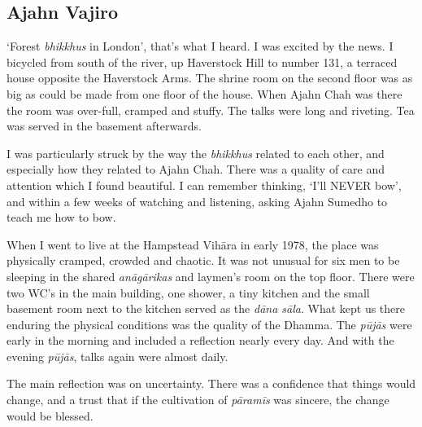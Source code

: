 \subsection{Ajahn Vajiro}

`Forest \emph{bhikkhus} in London', that's what I heard. I was excited by the
news. I bicycled from south of the river, up Haverstock Hill to number
131, a terraced house opposite the Haverstock Arms. The shrine room on
the second floor was as big as could be made from one floor of the
house. When Ajahn Chah was there the room was over-full, cramped and
stuffy. The talks were long and riveting. Tea was served in the basement
afterwards. 

I was particularly struck by the way the \emph{bhikkhus} related to each
other, and especially how they related to Ajahn Chah. There was a
quality of care and attention which I found beautiful. I can remember
thinking, `I'll NEVER bow', and within a few weeks of watching and
listening, asking Ajahn Sumedho to teach me how to bow. 

When I went to live at the Hampstead Vihāra in early 1978, the place was
physically cramped, crowded and chaotic. It was not unusual for six men
to be sleeping in the shared \emph{anāgārikas} and laymen's room on the top
floor. There were two WC's in the main building, one shower, a tiny
kitchen and the small basement room next to the kitchen served as the
\emph{dāna sāla}. What kept us there enduring the physical conditions
was the quality of the Dhamma. The \emph{pūjās} were early in the
morning and included a reflection nearly every day. And with the evening
\emph{pūjās}, talks again were almost daily. 

The main reflection was on uncertainty. There was a confidence that
things would change, and a trust that if the cultivation of
\emph{pāramīs} was sincere, the change would be blessed. 

